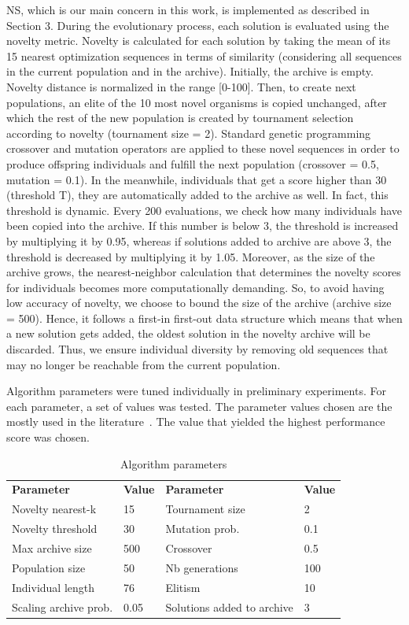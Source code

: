 NS, which is our main concern in this work, is implemented as described in Section 3. During the evolutionary process, each solution is evaluated using the novelty metric. Novelty is calculated for each solution by taking the mean of its 15 nearest optimization sequences in terms of similarity (considering all sequences in the current population and in the archive). Initially, the archive is empty. Novelty distance is normalized in the range [0-100].
Then, to create next populations, an elite of the 10 most novel organisms is copied unchanged, after which the rest of the new population is created by tournament selection according to novelty (tournament size = 2). Standard genetic programming crossover and mutation operators are applied to these novel sequences in order to produce offspring individuals and fulfill the next population (crossover = 0.5, mutation = 0.1).
In the meanwhile, individuals that get a score higher than 30 (threshold T), they are automatically added to the archive as well. 
In fact, this threshold is dynamic. Every 200 evaluations, we check how many individuals have been copied into the archive. If this number is below 3, the threshold is increased by multiplying it by 0.95, whereas if solutions added to archive are above 3, the threshold is decreased by multiplying it by 1.05. 
Moreover, as the size of the archive grows, the nearest-neighbor calculation that determines the novelty scores for individuals becomes more computationally demanding. So, to avoid having low accuracy of novelty, we choose to bound the size of the archive (archive size = 500). Hence, it follows a first-in first-out data structure which means that when a new solution gets added, the oldest solution in the novelty archive will be discarded. Thus, we ensure individual diversity by removing old sequences that may no longer be reachable from the current population.

Algorithm parameters were tuned individually in preliminary experiments. For each parameter, a set of values was tested. The parameter values chosen are the mostly used in the literature~\cite{inden2013examination}. The value that yielded the highest performance score was chosen.  

\begin{table}
	\caption{Algorithm parameters}
	\begin{tabular}{| l |l| l |l| }\hline
		\textbf{Parameter} & \textbf{Value} & \textbf{Parameter} & \textbf{Value} \\	\hhline{|=|=|=|=|}	
		Novelty nearest-k  & 15 &  Tournament size & 2\\ 
		Novelty threshold & 30 &  Mutation prob. & 0.1\\  
		Max archive size & 500 &  Crossover & 0.5  \\  
		Population size & 50 &  Nb generations &  100 \\  
		Individual length & 76 & Elitism & 10  \\ 
		Scaling archive prob. & 0.05 & Solutions added to archive & 3  \\ 	\hline
	\end{tabular}
\end{table}

